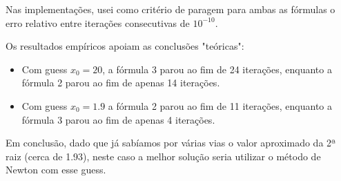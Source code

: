 Nas implementações, usei como critério de paragem para ambas as fórmulas o erro relativo entre iterações consecutivas de $10^{-10}$.

Os resultados empíricos apoiam as conclusões "teóricas":
\begin{itemize}
    \item Com guess $x_0=20$, a fórmula 3 parou ao fim de 24 iterações, enquanto a fórmula 2 parou ao fim de apenas 14 iterações.
    \item Com guess $x_0=1.9$ a fórmula 2 parou ao fim de 11 iterações, enquanto a fórmula 3 parou ao fim de apenas 4 iterações.
\end{itemize}
Em conclusão, dado que já sabíamos por várias vias o valor aproximado da 2ª raiz (cerca de 1.93), neste caso a melhor solução seria utilizar o método de Newton com esse guess.

